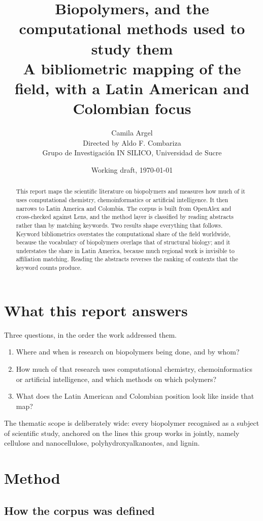 \documentclass[11pt,a4paper]{article}
\title{\textbf{Biopolymers, and the computational methods used to study them}\\[0.3em]
\large A bibliometric mapping of the field, with a Latin American and Colombian focus}
\author{Camila Argel \\ \small Directed by Aldo F. Combariza \\
\small Grupo de Investigación IN SILICO, Universidad de Sucre}
\date{Working draft, \today}
\begin{document}
\maketitle

\begin{abstract}
\noindent
This report maps the scientific literature on biopolymers and measures how much of it uses
computational chemistry, chemoinformatics or artificial intelligence. It then narrows to
Latin America and Colombia. The corpus is built from OpenAlex and cross-checked against
Lens, and the method layer is classified by reading abstracts rather than by matching
keywords. Two results shape everything that follows. Keyword bibliometrics overstates the
computational share of the field worldwide, because the vocabulary of biopolymers overlaps
that of structural biology; and it understates the share in Latin America, because much
regional work is invisible to affiliation matching. Reading the abstracts reverses the
ranking of contexts that the keyword counts produce.
\end{abstract}

\section{What this report answers}

Three questions, in the order the work addressed them.

\begin{enumerate}
\item Where and when is research on biopolymers being done, and by whom?
\item How much of that research uses computational chemistry, chemoinformatics or
      artificial intelligence, and which methods on which polymers?
\item What does the Latin American and Colombian position look like inside that map?
\end{enumerate}

The thematic scope is deliberately wide: every biopolymer recognised as a subject of
scientific study, anchored on the lines this group works in jointly, namely cellulose and
nanocellulose, polyhydroxyalkanoates, and lignin.

\section{Method}

\subsection{How the corpus was defined}
\end{document}
